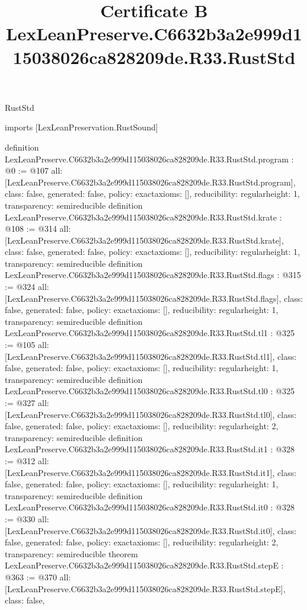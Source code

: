 \begin{lexlean}{RustStd}
\title{Certificate B LexLeanPreserve.C6632b3a2e999d115038026ca828209de.R33.RustStd}
\begin{coremodule}
imports [LexLeanPreservation.RustSound]

definition LexLeanPreserve.C6632b3a2e999d115038026ca828209de.R33.RustStd.program : @0 := @107 {
  all: [LexLeanPreserve.C6632b3a2e999d115038026ca828209de.R33.RustStd.program],
  class: false,
  generated: false,
  policy: exact{axioms: []},
  reducibility: regular{height: 1},
  transparency: semireducible
}
definition LexLeanPreserve.C6632b3a2e999d115038026ca828209de.R33.RustStd.krate : @108 := @314 {
  all: [LexLeanPreserve.C6632b3a2e999d115038026ca828209de.R33.RustStd.krate],
  class: false,
  generated: false,
  policy: exact{axioms: []},
  reducibility: regular{height: 1},
  transparency: semireducible
}
definition LexLeanPreserve.C6632b3a2e999d115038026ca828209de.R33.RustStd.flags : @315 := @324 {
  all: [LexLeanPreserve.C6632b3a2e999d115038026ca828209de.R33.RustStd.flags],
  class: false,
  generated: false,
  policy: exact{axioms: []},
  reducibility: regular{height: 1},
  transparency: semireducible
}
definition LexLeanPreserve.C6632b3a2e999d115038026ca828209de.R33.RustStd.tl1 : @325 := @105 {
  all: [LexLeanPreserve.C6632b3a2e999d115038026ca828209de.R33.RustStd.tl1],
  class: false,
  generated: false,
  policy: exact{axioms: []},
  reducibility: regular{height: 1},
  transparency: semireducible
}
definition LexLeanPreserve.C6632b3a2e999d115038026ca828209de.R33.RustStd.tl0 : @325 := @327 {
  all: [LexLeanPreserve.C6632b3a2e999d115038026ca828209de.R33.RustStd.tl0],
  class: false,
  generated: false,
  policy: exact{axioms: []},
  reducibility: regular{height: 2},
  transparency: semireducible
}
definition LexLeanPreserve.C6632b3a2e999d115038026ca828209de.R33.RustStd.it1 : @328 := @312 {
  all: [LexLeanPreserve.C6632b3a2e999d115038026ca828209de.R33.RustStd.it1],
  class: false,
  generated: false,
  policy: exact{axioms: []},
  reducibility: regular{height: 1},
  transparency: semireducible
}
definition LexLeanPreserve.C6632b3a2e999d115038026ca828209de.R33.RustStd.it0 : @328 := @330 {
  all: [LexLeanPreserve.C6632b3a2e999d115038026ca828209de.R33.RustStd.it0],
  class: false,
  generated: false,
  policy: exact{axioms: []},
  reducibility: regular{height: 2},
  transparency: semireducible
}
theorem LexLeanPreserve.C6632b3a2e999d115038026ca828209de.R33.RustStd.stepE : @363 := @370 {
  all: [LexLeanPreserve.C6632b3a2e999d115038026ca828209de.R33.RustStd.stepE],
  class: false,
}
\end{coremodule}
\end{lexlean}
